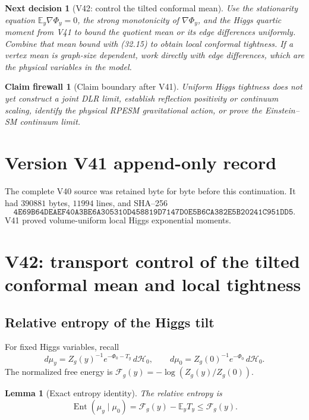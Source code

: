 \documentclass[11pt]{article}
\newtheorem{lemma}[theorem]{Lemma}
\newtheorem{firewall}[theorem]{Claim firewall}
\newtheorem{decision}[theorem]{Next decision}
\theoremstyle{remark}
\begin{document}
\begin{decision}[V42: control the tilted conformal mean]
\label{dec:v17v41-next}
Use the stationarity equation
\(\mathbb E_y\nabla\Phi_y=0\), the strong monotonicity of
\(\nabla\Phi_y\), and the Higgs quartic moment from V41 to bound the
quotient mean or its edge differences uniformly.  Combine that mean
bound with (32.15) to obtain local conformal tightness.  If a vertex
mean is graph-size dependent, work directly with edge differences,
which are the physical variables in the model.
\end{decision}

\begin{firewall}[Claim boundary after V41]
\label{fire:v17v41}
Uniform Higgs tightness does not yet construct a joint DLR limit,
establish reflection positivity or continuum scaling, identify the
physical RPESM gravitational action, or prove the Einstein--SM
continuum limit.
\end{firewall}

\section*{Version V41 append-only record}
The complete V40 source was retained byte for byte before this
continuation.  It had \(390881\) bytes, \(11994\) lines, and SHA--256
\[
 \texttt{4E69B64DEAEF40A3BE6A305310D458819D7147D0E5B6CA382E5B20241C951DD5}.
\]
V41 proved volume-uniform local Higgs exponential moments.


\section{V42: transport control of the tilted conformal mean and local tightness}
\label{sec:v17v42}

\subsection{Relative entropy of the Higgs tilt}

For fixed Higgs variables, recall
\[
 d\mu_y=Z_g(y)^{-1}e^{-\Phi_0-T_y}\,d\mathcal H_0,
 \qquad
 d\mu_0=Z_g(0)^{-1}e^{-\Phi_0}\,d\mathcal H_0.     \tag{42.1}
\]
The normalized free energy is
\(\mathcal F_g(y)=-\log(Z_g(y)/Z_g(0))\).

\begin{lemma}[Exact entropy identity]
\label{lem:v17v42-entropy}
The relative entropy is
\[
 \operatorname{Ent}(\mu_y\mid\mu_0)
 =\mathcal F_g(y)-\mathbb E_yT_y
 \leq\mathcal F_g(y).                             \tag{42.2}
\]
\end{lemma}
\end{document}
